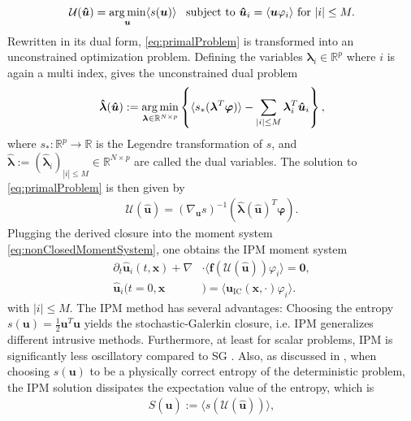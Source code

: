 \begin{align}\label{eq:primalProblem}
\mathcal{U}(\bm{\hat u}) = \operatorname*{arg\,min}_{\bm u} \langle s(\bm u) \rangle \enskip \text{ subject to } \bm{\hat u}_i = \langle \bm u \varphi_i \rangle \text{ for } |i| \leq M.
\end{align}
Rewritten in its dual form, \eqref{eq:primalProblem} is transformed into an unconstrained optimization problem. Defining the variables $\bm{\lambda}_i\in\mathbb{R}^p$ where $i$ is again a multi index, gives the unconstrained dual problem
\begin{align}\label{eq:dualProblem}
 \bm{\hat \lambda}(\bm{\hat u}) := \operatorname*{arg\,min}_{\bm{\lambda} \in \mathbb{R}^{N \times p}}
  \left\{\langle s_*(\bm{\lambda}^T \bm\varphi)\rangle - \sum_{|i|\leq M}\bm{\lambda}_i^T \bm{\hat u}_i\right\},
\end{align}
where $s_*:\mathbb{R}^p\to\mathbb{R}$ is the Legendre transformation of $s$, and $\bm{ \hat\lambda}:=(\bm{\hat{\lambda}}_i)_{|i|\leq M}\in \mathbb{R}^{N \times p}$ are called the dual variables. The solution to \eqref{eq:primalProblem} is then given by
\begin{align}\label{eq:ansatz}
 \mathcal{U}(\bm{\hat u}) = \left( \nabla_{\bm{u}} s \right)^{-1}(\bm{\hat{\lambda}}(\bm{\hat u})^T \bm{\varphi}).
\end{align}
Plugging the derived closure into the moment system \eqref{eq:nonClosedMomentSystem}, one obtains the IPM moment system
\begin{subequations}\label{eq:IPMmomentSystem}
\begin{align}
\partial_t \bm{\hat u}_i(t,\bm{x}) + \nabla&\cdot\langle\bm{f}(\mathcal{U}(\bm{\hat u})) \varphi_i\rangle = \bm{0}, \\
\bm{\hat u}_i(t=0,\bm{x}&) = \langle\bm{u}_{\text{IC}}(\bm{x},\cdot)\varphi_i\rangle.
\end{align}
\end{subequations}
with $|i|\leq M$. The IPM method has several advantages: Choosing the entropy $s(\bm{u}) = \frac{1}{2}\bm{u}^T\bm{u}$ yields the stochastic-Galerkin closure, i.e. IPM generalizes different intrusive methods. Furthermore, at least for scalar problems, IPM is significantly less oscillatory compared to SG \cite{kusch2017maximum}. Also, as discussed in \cite{poette2009uncertainty}, when choosing $s(\bm u)$ to be a physically correct entropy of the deterministic problem, the IPM solution dissipates the expectation value of the entropy, which is
\begin{align*}
S(\bm{\hat u}) := \langle s( \mathcal{U}(\bm{\hat u}))\rangle,
\end{align*}
